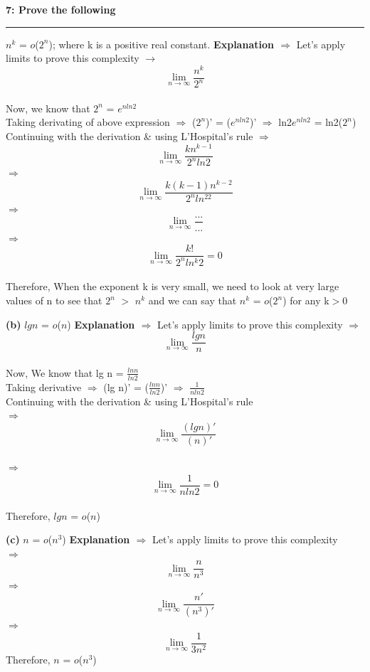 \documentclass[11pt]{article}
\newcommand\question[3]{\vspace{.25in}\textbf{#1: #2}\vspace{.5em}\hrule\vspace{.10in}}
\renewcommand\part[1]{\vspace{.10in}\textbf{(#1)}}
\begin{document}

\question{7} {Prove the following}

\part{a} $n^k$ = $o$($2^n$); where k is a positive real constant.
\newline
\textbf{Explanation $\Rightarrow$} Let's apply limits to prove this complexity $\rightarrow$ \\
$$\lim_{n\to\infty} \frac{n^k}{2^n}$$ \\
Now, we know that $2^n$ = $e^{n ln 2}$ \\
Taking derivating of above expression $\Rightarrow$ ($2^n$)' = ($e^{n ln 2}$)' $\Rightarrow$ ln2$e^{nln2}$ = ln2($2^n$) \\
Continuing with the derivation \& using L'Hospital's rule $\Rightarrow$ 
$$\lim_{n\to\infty} \frac{kn^{k-1}}{2^nln2}$$ 
$\Rightarrow$ 
$$\lim_{n\to\infty} \frac{k(k-1)n^{k-2}}{2^nln^22}$$
$\Rightarrow$
$$\lim_{n\to\infty} \frac{. . .}{. . .}$$
$\Rightarrow$
$$\lim_{n\to\infty} \frac{k!}{2^nln^k2} = 0$$ \\
Therefore, When	the	exponent k is very small, we need to	look at very large values of	n to see	that $2^n$ $>$ $n^k$ and we can say that $n^k$ = $o$($2^n$) for any k$>$0

\part{b} $lg n$ = $o$($n$)
\newline
\textbf{Explanation $\Rightarrow$} Let's apply limits to prove this complexity $\Rightarrow$ \\
$$\lim_{n\to\infty} \frac{lg n}{n}$$ \\
Now, We know that lg n = $\frac{ln n}{ln 2}$ \newline \\
Taking derivative $\Rightarrow$ (lg n)' = ($\frac{ln n}{ln 2}$)' $\Rightarrow$ $\frac{1}{nln 2}$ \newline \\
Continuing with the derivation \& using L'Hospital's rule \\
$\Rightarrow$
$$\lim_{n\to\infty} \frac{(lg n)'}{(n)'}$$ \\
$\Rightarrow$
$$\lim_{n\to\infty} \frac{1}{n ln 2} = 0$$ \\
Therefore, $lg n$ = $o$($n$)

\part{c} $n$ = $o$($n^3$)
\newline
\textbf{Explanation $\Rightarrow$} Let's apply limits to prove this complexity \\
$\Rightarrow$ $$\lim_{n\to\infty} \frac{n}{n^3}$$ 
$\Rightarrow$ $$\lim_{n\to\infty} \frac{n'}{(n^3)'}$$ 
$\Rightarrow$ $$\lim_{n\to\infty} \frac{1}{3n^2}$$
Therefore, $n$ = $o$($n^3$)

\hrulefill
\end{document}
